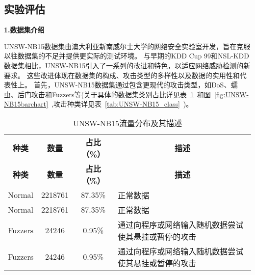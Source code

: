 \subsection{实验评估}
\textbf{1.数据集介绍}\par
UNSW-NB15数据集\cite{moustafa2015comprehensive}由澳大利亚新南威尔士大学的网络安全实验室开发，旨在克服以往数据集的不足并提供更实际的测试环境。
与早期的KDD Cup 99和NSL-KDD数据集相比，UNSW-NB15引入了一系列的改进和特色，以适应网络威胁检测的新要求。
这些改进体现在数据集的构成、攻击类型的多样性以及数据的实用性和代表性上。
首先，UNSW-NB15数据集通过包含更现代的攻击类型，如DoS、蠕虫、后门攻击和Fuzzers等(关于具体的数据集类别占比详见表~\ref{tab:UNSW-NB15_distribution}~和图~\ref{fig:UNSW-NB15barchart}~,攻击种类详见表~\ref{tab:UNSW-NB15_class}~)。
\begin{table}[h]
	\caption{UNSW-NB15流量分布及其描述}
	\label{tab:UNSW-NB15_distribution}
	\begin{tabularx}{\textwidth}{@{}cccX@{}}
		\toprule
		\multicolumn{1}{c}{\textbf{种类}} & \multicolumn{1}{c}{\textbf{数量}} & \multicolumn{1}{c}{\textbf{占比（\%）}} & \multicolumn{1}{c}{\textbf{描述}}                                                                \\
		\multicolumn{1}{c}{\textbf{种类}} & \multicolumn{1}{c}{\textbf{数量}} & \multicolumn{1}{c}{\textbf{占比（\%）}} & \multicolumn{1}{c}{\textbf{描述}}                                                                \\
		\midrule
		Normal                            & 2218761                           & 87.35\%                                 & 正常数据                                                                                         \\
		Normal                            & 2218761                           & 87.35\%                                 & 正常数据                                                                                         \\

		Fuzzers                           & 24246                             & 0.95\%                                  & 通过向程序或网络输入随机数据尝试使其悬挂或暂停的攻击                                             \\
		Fuzzers                           & 24246                             & 0.95\%                                  & 通过向程序或网络输入随机数据尝试使其悬挂或暂停的攻击                                             \\


\end{tabularx}
\end{table}
